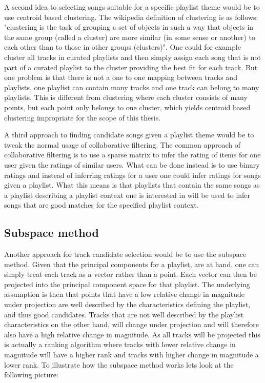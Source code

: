 \documentclass[a4paper,11pt]{kth-mag}
\begin{document}
A second idea to selecting songs suitable for a specific playlist theme would be to use centroid based clustering. The wikipedia definition of clustering is as follows: "clustering is the task of grouping a set of objects in such a way that objects in the same group (called a cluster) are more similar (in some sense or another) to each other than to those in other groups (clusters)". One could for example cluster all tracks in curated playlists and then simply assign each song that is not part of a curated playlist to the cluster providing the best fit for each track. But one problem is that there is not a one to one mapping between tracks and playlists, one playlist can contain many tracks and one track can belong to many playlists. This is different from clustering where each cluster consists of many points, but each point only belongs to one cluster, which yields centroid based clustering impropriate for the scope of this thesis. 

A third approach to finding candidate songs given a playlist theme would be to tweak the normal usage of collaborative filtering. The common approach of collaborative filtering is to use a sparse matrix to infer the rating of items for one user given the ratings of similar users. What can be done instead is to use binary ratings and instead of inferring ratings for a user one could infer ratings for songs given a playlist. What this means is that playlists that contain the same songs as a playlist describing a playlist context one is interested in will be used to infer songs that are good matches for the specified playlist context. 

\subsection{Subspace method}
Another approach for track candidate selection would be to use the subspace method. Given that the principal components for a playlist, are at hand, one can simply treat each track as a vector rather than a point. Each vector can then be projected into the principal component space for that playlist. The underlying assumption is then that points that have a low relative change in magnitude under projection are well described by the characteristics defining the playlist, and thus good candidates. Tracks that are not well described by the playlist characteristics on the other hand, will change under projection and will therefore also have a high relative change in magnitude. As all tracks will be projected this is actually a ranking algorithm where tracks with lower relative change in magnitude will have a higher rank and tracks with higher change in magnitude a lower rank. To illustrate how the subspace method works lets look at the following picture:
\end{document}
